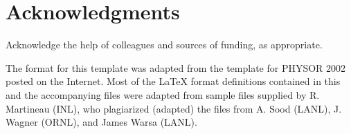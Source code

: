 \documentclass{ansjournal}
\begin{document}
\section*{Acknowledgments}

Acknowledge the help of colleagues and sources of funding, as appropriate.

The format for this template was adapted from the template for PHYSOR 2002
posted on the Internet.  Most of the {\LaTeX} format definitions contained
in this and the accompanying files were adapted from sample files supplied
by R. Martineau (INL), who plagiarized (adapted) the files from A. Sood
(LANL), J. Wagner (ORNL), and James Warsa (LANL).


\setlength{\baselineskip}{12pt}



\end{document}
